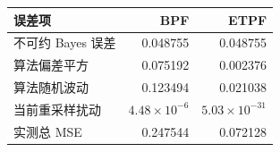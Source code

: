 \begin{tabular}{lrr}
\toprule[1.5pt]
误差项 & BPF & ETPF \\
\midrule[1pt]
不可约 Bayes 误差 & 0.048755 & 0.048755 \\
算法偏差平方 & 0.075192 & 0.002376 \\
算法随机波动 & 0.123494 & 0.021038 \\
当前重采样扰动 & $4.48\times10^{-6}$ & $5.03\times10^{-31}$ \\
\midrule[1pt]
实测总 MSE & 0.247544 & 0.072128 \\
\bottomrule[1.5pt]
\end{tabular}
